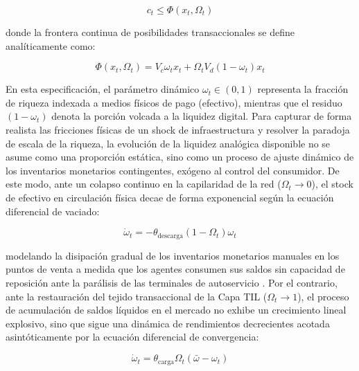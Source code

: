 \begin{equation}
c_t \leq \Phi(x_t,\Omega_t)
\end{equation}

donde la frontera continua de posibilidades transaccionales se define anal\'iticamente como:

\begin{equation}
\Phi(x_t,\Omega_t) = V_c \omega_t x_t + \Omega_t V_d (1 - \omega_t) x_t
\end{equation}

En esta especificaci\'on, el par\'ametro din\'amico $\omega_t \in (0,1)$ representa la fracci\'on de riqueza indexada a medios f\'isicos de pago (efectivo), mientras que el residuo $(1-\omega_t)$ denota la porci\'on volcada a la liquidez digital. Para capturar de forma realista las fricciones f\'isicas de un shock de infraestructura y resolver la paradoja de escala de la riqueza, la evoluci\'on de la liquidez anal\'ogica disponible no se asume como una proporci\'on est\'atica, sino como un proceso de ajuste din\'amico de los inventarios monetarios contingentes, ex\'ogeno al control del consumidor. De este modo, ante un colapso continuo en la capilaridad de la red ($\Omega_t \to 0$), el stock de efectivo en circulaci\'on f\'isica decae de forma exponencial seg\'un la ecuaci\'on diferencial de vaciado:

\begin{equation}
\dot{\omega}_t = -\theta_{\text{descarga}}(1 - \Omega_t)\omega_t
\end{equation}

modelando la disipaci\'on gradual de los inventarios monetarios manuales en los puntos de venta a medida que los agentes consumen sus saldos sin capacidad de reposici\'on ante la par\'alisis de las terminales de autoservicio \citep{alvarez2009financial}. Por el contrario, ante la restauraci\'on del tejido transaccional de la Capa TIL ($\Omega_t \to 1$), el proceso de acumulaci\'on de saldos l\'iquidos en el mercado no exhibe un crecimiento lineal explosivo, sino que sigue una din\'amica de rendimientos decrecientes acotada asint\'oticamente por la ecuaci\'on diferencial de convergencia:

\begin{equation}
\dot{\omega}_t = \theta_{\text{carga}}\Omega_t(\bar{\omega} - \omega_t)
\end{equation}

